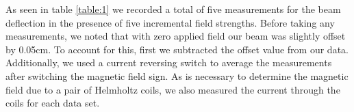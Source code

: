 \documentclass[12pt]{article}
\begin{document}
	As seen in table \ref{table:1} we recorded a total of five measurements for the beam deflection in the presence of five incremental field strengths. Before taking any measurements, we noted that with zero applied field our beam was slightly offset by 0.05cm. To account for this, first we subtracted the offset value from our data. Additionally, we used a current reversing switch to average the measurements after switching the magnetic field sign. As is necessary to determine the magnetic field due to a pair of Helmholtz coils, we also measured the current through the coils for each data set.
    
\begin{table}[h!]
\centering
\caption{Vertical Beam Deflection}
\label{my-label}
\label{table:1}
\end{table}
\end{document}
